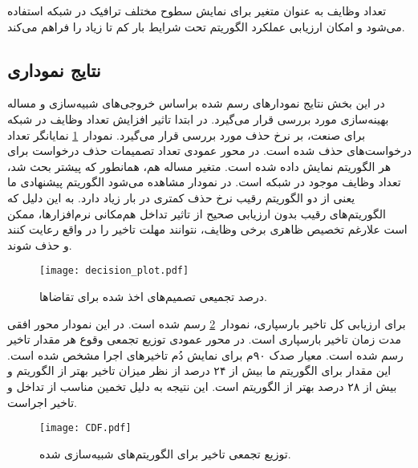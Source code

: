 تعداد وظایف به عنوان متغیر برای نمایش سطوح مختلف ترافیک در شبکه  استفاده می‌شود و امکان ارزیابی عملکرد الگوریتم تحت شرایط بار کم تا زیاد را فراهم می‌کند.

\subsection{نتایج نموداری}

در این بخش‌ نتایج نمودارهای رسم شده براساس خروجی‌های شبیه‌سازی و مساله بهینه‌سازی مورد بررسی قرار می‌گیرد. در ابتدا تاثیر افزایش تعداد وظایف در شبکه  برای صنعت، بر نرخ حذف مورد بررسی قرار می‌گیرد. نمودار~\ref{figure:decision_plot} نمایانگر تعداد درخواست‌های حذف شده است. در محور عمودی تعداد تصمیمات حذف درخواست برای هر الگوریتم نمایش داده شده است. متغیر مساله هم، همانطور که پیشتر بحث شد، تعداد وظایف موجود در شبکه است. در نمودار مشاهده می‌شود الگوریتم پیشنهادی ما یعنی  از دو الگوریتم رقیب نرخ حذف کمتری در بار زیاد دارد. به این دلیل که الگوریتم‌های رقیب بدون ارزیابی صحیح از تاثیر تداخل هم‌مکانی نرم‌افزارها، ممکن است علارغم تخصیص ظاهری برخی وظایف، نتوانند مهلت تاخیر را در واقع رعایت کنند و حذف شوند.

\vspace{0.5cm}
\begin{figure}[h]
\centering
\texttt{[image: decision\_plot.pdf]}
\caption{درصد تجمیعی تصمیم‌های اخذ شده برای تقاضاها.}
\label{figure:decision_plot}
\end{figure}
\vspace{0.5cm}

برای ارزیابی کل تاخیر بارسپاری، نمودار~\ref{figure:CDF_plot} رسم شده است. در این نمودار محور افقی مدت زمان تاخیر بارسپاری است. در محور عمودی توزیع تجمعی وقوع هر مقدار تاخیر رسم شده است. معیار صدک ۹۰م برای نمایش دُم تاخیرهای اجرا مشخص شده است. این مقدار برای الگوریتم ما بیش از ۲۴ درصد از نظر میزان تاخیر بهتر از الگوریتم  و بیش از ۲۸ درصد بهتر از الگوریتم  است. این نتیجه به دلیل تخمین مناسب از تداخل و تاخیر اجراست.

\vspace{0.5cm}
\begin{figure}[h]
\centering
\texttt{[image: CDF.pdf]}
\caption{توزیع تجمعی تاخیر برای الگوریتم‌های شبیه‌سازی شده.}
\label{figure:CDF_plot}
\end{figure}
\vspace{0.5cm}

